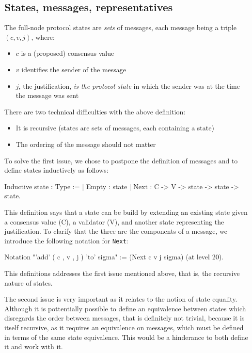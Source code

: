 \subsection{States, messages, representatives}

The full-node protocol states are {\em sets} of messages,
each message being a triple $(c, v, j)$, where:
\begin{itemize}
    \item $c$ is a (proposed) consensus value
    \item $v$ identifies the sender of the message
    \item $j$, the justification, {\em is the protocol state} in which the sender
        was at the time the message was sent
\end{itemize}

There are two technical difficulties with the above definition:  
\begin{itemize}
    \item It is recursive (states are sets of messages, each containing a state)
    \item The ordering of the message should not matter
\end{itemize}

To solve the first issue, we chose to postpone the definition of messages and
to define states inductively as follows:

\begin{coq}
Inductive state : Type :=
  | Empty : state
  | Next : C ->  V -> state -> state -> state.
\end{coq}

This definition says that a state can be build by extending an existing state
given a consensus value (C), a validator (V), and another state representing
the justification.
To clarify that the three are the components of a message, we introduce the
following notation for \verb"Next":

\begin{coq}
Notation "'add' ( c , v , j ) 'to' sigma" :=
  (Next c v j sigma)
  (at level 20).
\end{coq}

This definitions addresses the first issue mentioned above, that is, the 
recursive nature of states.

The second issue is very important as it relates to the notion of
state equality.
Although it is pottentially possible to define an equivalence between
states which disregards the order between messages, that is definitely
not trivial, because it is itself recursive, as it requires an equivalence
on messages, which must be defined in terms of the same state equivalence.
This would be a hinderance to both define it and work with it.

